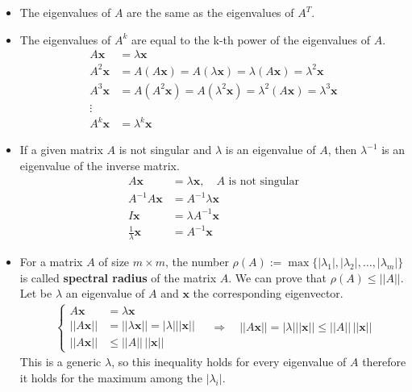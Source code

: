 \begin{itemize}
\item The eigenvalues of \( A \) are the same as the eigenvalues of \( A^T \).
\item The eigenvalues of \( A^k \) are equal to the k-th power of the eigenvalues of \( A \).
    \begin{align*}
        A\mathbf{x} &= \lambda \mathbf{x} \\
        A^2\mathbf{x} &= A(A\mathbf{x}) = A(\lambda \mathbf{x}) = \lambda (A\mathbf{x}) = \lambda^2 \mathbf{x} \\
        A^3\mathbf{x} &= A(A^2\mathbf{x}) = A(\lambda^2 \mathbf{x}) = \lambda^2 (A\mathbf{x}) = \lambda^3 \mathbf{x} \\
        \vdots \\
        A^k\mathbf{x} &= \lambda^k \mathbf{x}
    \end{align*}
\item If a given matrix $A$ is not singular and $\lambda$ is an eigenvalue of $A$, then $\lambda^{-1}$ is an eigenvalue of the inverse matrix.
    \begin{align*}
        A\mathbf{x} &= \lambda \mathbf{x} , \quad A \text{ is not singular} \\
        A^{-1}A\mathbf{x} &= A^{-1} \lambda \mathbf{x} \\
        I\mathbf{x} &= \lambda A^{-1} \mathbf{x} \\
        \frac{1}{\lambda} \mathbf{x} &= A^{-1} \mathbf{x}
    \end{align*}
\item For a matrix \( A \) of size \( m \times m \), the number
    $\rho(A) := \max\{|\lambda_1|, |\lambda_2|, \ldots, |\lambda_m|\}$
    is called \textbf{spectral radius} of the matrix $A$.
    We can prove that $\rho(A) \leq ||A||$. \newline
    Let be $\lambda$ an eigenvalue of $A$ and $\mathbf{x}$ the corresponding eigenvector.
    \begin{align*}
        \left\{
        \begin{aligned}
            A\mathbf{x} &= \lambda \mathbf{x} \\
            ||A\mathbf{x}|| &= ||\lambda \mathbf{x}|| = |\lambda| ||\mathbf{x}||\\
            ||A\mathbf{x}|| &\leq ||A|| \, ||\mathbf{x}||
        \end{aligned}
        \right.
        \quad
        \Rightarrow \quad
        ||A\mathbf{x}|| = |\lambda| ||\mathbf{x}|| \leq ||A|| \, ||\mathbf{x}||
    \end{align*}
    This is a generic $\lambda$, so this inequality holds for every eigenvalue of $A$
    therefore it holds for the maximum among the $|\lambda_i|$.
\end{itemize}

